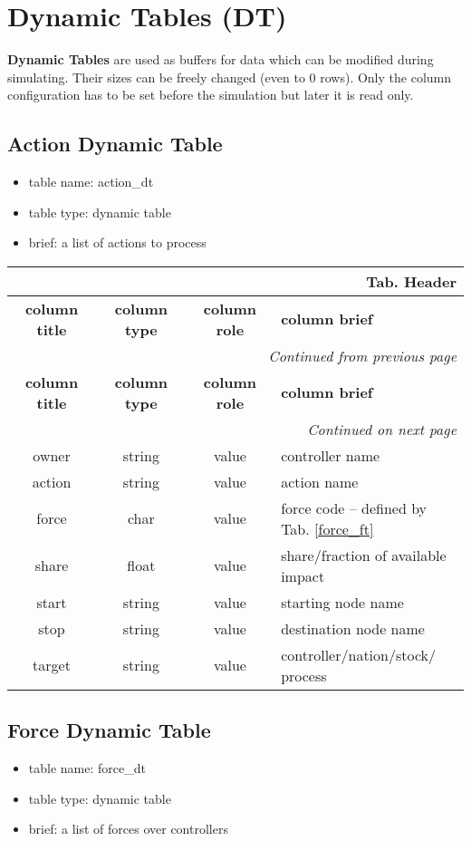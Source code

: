 \documentclass[a4paper,oneside,titlepage]{report}
\newcommand*{\LTHeaderIV}[5]{
  \multicolumn{4}{r}{\textbf{Tab. \thesubsection} \textbf{#1}}\\    
  \hline
  \textbf{#2} & \textbf{#3} & \textbf{#4} & \textbf{#5}\\
  \hline
  
  \endfirsthead
  \multicolumn{4}{r}{\textit{Continued from previous page}}\\    
  \hline
  \textbf{#2} & \textbf{#3} & \textbf{#4} & \textbf{#5}\\
  \hline
  \endhead
  \hline
  \multicolumn{4}{r}{\textit{Continued on next page}}\\
  \endfoot
  \hline
  \endlastfoot  
}
\begin{document}
\section{Dynamic Tables (DT)}
\textbf{Dynamic Tables} are used as buffers for data which can be modified during simulating. Their sizes can be freely changed (even to 0 rows). Only the column configuration has to be set before the simulation but later it is read only. 

\subsection{Action Dynamic Table}
\begin{itemize}
  \setlength{\itemsep}{0pt}
  \setlength{\parskip}{0pt}
\item table name: action\_dt  
\item table type: dynamic table   
\item brief: a list of actions to process
\end{itemize}

\vspace{-0.5cm}
\begin{longtable}{ |c|c|c|l| } 
  \LTHeaderIV{Header}{column title}{column type}{column role}{column brief}                    
  owner & string & value & controller name \\
  action & string & value & action name\\
  force & char & value & force code -- defined by Tab. \ref{force_ft}\\
  share & float & value & share$/$fraction of available impact\\
  start & string & value & starting node name\\
  stop & string & value & destination node name\\
  target & string & value & controller$/$nation$/$stock$/$process \\
\end{longtable}        

\subsection{Force Dynamic Table}
\begin{itemize}
  \setlength{\itemsep}{0pt}
  \setlength{\parskip}{0pt}
\item table name: force\_dt  
\item table type: dynamic table   
\item brief: a list of forces over controllers
\end{itemize}
\end{document}
